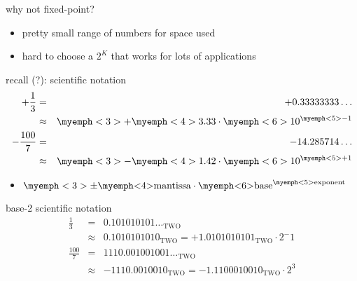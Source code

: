 \begin{frame}{why not fixed-point?}
\begin{itemize}
\item pretty small range of numbers for space used
\item hard to choose a $2^K$ that works for lots of applications
\end{itemize}
\end{frame}

\begin{frame}{recall (?): scientific notation}
\begin{eqnarray*}
+\frac{1}{3} &=& +0.33333333\ldots \\
            &\approx& \myemph<3>{+}\myemph<4>{3.33}\cdot \myemph<6>{10}^{\myemph<5>{-1}} \\
-\frac{100}{7} &=& -14.285714\ldots \\
            &\approx& \myemph<3>{-}\myemph<4>{1.42}\cdot \myemph<6>{10}^{\myemph<5>{+1}} \\
\end{eqnarray*}
\begin{itemize}
\item<2-> $\myemph<3>{\pm}\text{\myemph<4>{mantissa}} \cdot \text{\myemph<6>{base}}^\text{\myemph<5>{exponent}}$
\end{itemize}
\end{frame}

\begin{frame}{base-2 scientific notation}
\begin{eqnarray*}
\frac{1}{3} &=& 0.101010101\ldots_\text{TWO}  \\\
            &\approx& 0.1010101010_\text{TWO} =  +1.0101010101_\text{TWO} \cdot 2^-1\\
\frac{100}{7} &=& 1110.001001001\ldots_\text{TWO}  \\\
            &\approx& -1110.0010010_\text{TWO} = -1.1100010010_\text{TWO} \cdot 2^3\\
\end{eqnarray*}
\end{frame}

